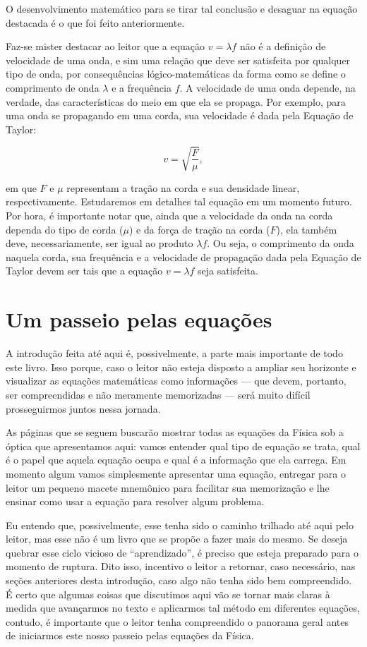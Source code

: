 O desenvolvimento matemático para se tirar tal conclusão e desaguar na equação destacada é o que foi feito anteriormente.

Faz-se mister destacar ao leitor que a equação $v=\lambda f$ não é a definição de velocidade de uma onda, e sim uma relação que deve ser satisfeita por qualquer tipo de onda, por consequências lógico-matemáticas da forma como se define o comprimento de onda $\lambda$ e a frequência $f.$ A velocidade de uma onda depende, na verdade, das características do meio em que ela se propaga. Por exemplo, para uma onda se propagando em uma corda, sua velocidade é dada pela Equação de Taylor:

$$ v = \sqrt{\dfrac{F}{\mu}},$$

\noindent em que $F$ e $\mu$ representam a tração na corda e sua densidade linear, respectivamente. Estudaremos em detalhes tal equação em um momento futuro. Por hora, é importante notar que, ainda que a velocidade da onda na corda dependa do tipo de corda ($\mu$) e da força de tração na corda ($F$), ela também deve, necessariamente, ser igual ao produto $\lambda f.$ Ou seja, o comprimento da onda naquela corda, sua frequência e a velocidade de propagação dada pela Equação de Taylor devem ser tais que a equação $v=\lambda f$ seja satisfeita.








\section{Um passeio pelas equações}

\lettrine{A}{} introdução feita até aqui é, possivelmente, a parte mais importante de todo este livro. Isso porque, caso o leitor não esteja disposto a ampliar seu horizonte e visualizar as equações matemáticas como informações --- que devem, portanto, ser compreendidas e não meramente memorizadas --- será muito difícil prosseguirmos juntos nessa jornada.

As páginas que se seguem buscarão mostrar todas as equações da Física sob a óptica que apresentamos aqui: vamos entender qual tipo de equação se trata, qual é o papel que aquela equação ocupa e qual é a informação que ela carrega. Em momento algum vamos simplesmente apresentar uma equação, entregar para o leitor um pequeno macete mnemônico para facilitar sua memorização e lhe ensinar como usar a equação para resolver algum problema. 

Eu entendo que, possivelmente, esse tenha sido o caminho trilhado até aqui pelo leitor, mas esse não é um livro que se propõe a fazer mais do mesmo. Se  deseja quebrar esse ciclo vicioso de ``aprendizado'', é preciso que esteja preparado para o momento de ruptura. Dito isso, incentivo o leitor a retornar, caso necessário, nas seções anteriores desta introdução, caso algo não tenha sido bem compreendido. É certo que algumas coisas que discutimos aqui vão se tornar mais claras à medida que avançarmos no texto e aplicarmos tal método em diferentes equações, contudo, é importante que o leitor tenha compreendido o panorama geral antes de iniciarmos este nosso passeio pelas equações da Física.

